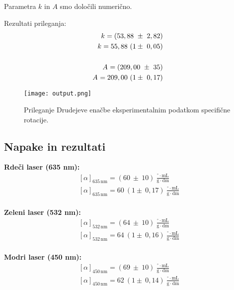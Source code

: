 \documentclass[9pt,a4paper,twocolumn,twoside]{tau-class/tau}
\newcommand{\abserr}[5]{
    \ensuremath{#1_{#2} = (#3 \ \pm \ #4) \ #5}
}
\newcommand{\relerr}[5]{
    \ensuremath{#1_{#2} = #3 \ (1 \pm \ #4) \ #5}
}
\begin{document}
Parametra $k$ in $A$ smo določili numerično.


Rezultati prileganja:
\begin{align*}
\abserr{k}{}{53,88}{2,82}{} \\
\relerr{k}{}{55,88}{0,05}{} \\\\
\noindent \abserr{A}{}{209,00}{35}{} \\
\relerr{A}{}{209,00}{0,17}{}
\end{align*}

\begin{figure}[H]
    \centering
    \texttt{[image: output.png]}
    \caption{Prileganje Drudejeve enačbe eksperimentalnim podatkom specifične rotacije.}
    \label{fig:specrot}
\end{figure}

\subsection{Napake in rezultati}

\textbf{Rdeči laser (635 nm):}
\begin{align*}
\abserr{[\alpha]}{635\,\text{nm}}{60}{10}{} \frac{^\circ \cdot \mathrm{mL}}{\mathrm{g} \cdot \mathrm{dm}}\\
\relerr{[\alpha]}{635\,\text{nm}}{60}{0,17}{} \frac{^\circ \cdot \mathrm{mL}}{\mathrm{g} \cdot \mathrm{dm}}\\
\end{align*}

\textbf{Zeleni laser (532 nm):}
\begin{align*}
\abserr{[\alpha]}{532\,\text{nm}}{64}{10}{} \frac{^\circ \cdot \mathrm{mL}}{\mathrm{g} \cdot \mathrm{dm}}\\
\relerr{[\alpha]}{532\,\text{nm}}{64}{0,16}{} \frac{^\circ \cdot \mathrm{mL}}{\mathrm{g} \cdot \mathrm{dm}}\\
\end{align*}

\textbf{Modri laser (450 nm):}
\begin{align*}
\abserr{[\alpha]}{450\,\text{nm}}{69}{10}{} \frac{^\circ \cdot \mathrm{mL}}{\mathrm{g} \cdot \mathrm{dm}}\\
\relerr{[\alpha]}{450\,\text{nm}}{62}{0,14}{} \frac{^\circ \cdot \mathrm{mL}}{\mathrm{g} \cdot \mathrm{dm}}
\end{align*}
\end{document}
